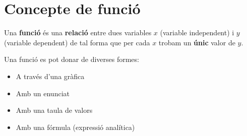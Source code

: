\section{Concepte de funció}


\begin{theorybox}
 Una \textbf{funció} és una \textbf{relació} entre dues variables $x$ (variable independent) i $y$ (variable dependent) de tal forma que per cada $x$ trobam un \textbf{únic} valor de $y$.

 Una funció es pot donar de diverses formes:
\begin{itemize}
	\item A través d'una gràfica 
	\item Amb un enunciat 
	\item Amb una taula de valors
	\item Amb una fórmula (expressió analítica)
\end{itemize}
\end{theorybox}


